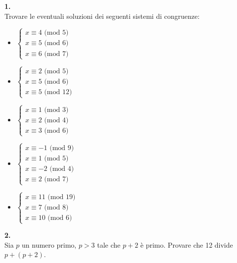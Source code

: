 \documentclass[italian,a4paper,11pt]
{article}
\begin{document}
\noindent
\begin{Ex}\textbf{ 1.}\\
Trovare le eventuali soluzioni dei seguenti sistemi di congruenze:
\begin{itemize}

\item $\begin{cases} x\equiv 4 \textrm{  (mod 5)} \\ x\equiv 5 \textrm{  (mod 6)} \\ x\equiv 6 \textrm{  (mod 7)} \end{cases} $

\item $  \begin{cases} x\equiv 2 \textrm{  (mod 5)} \\ x\equiv 5 \textrm{  (mod 6)} \\ x\equiv 5 \textrm{  (mod 12)} \end{cases} $

\item $  \begin{cases} x\equiv 1 \textrm{  (mod 3)} \\ x\equiv 2 \textrm{  (mod 4)} \\ x\equiv 3 \textrm{  (mod 6)}\end{cases} $

\item $  \begin{cases} x\equiv -1 \textrm{  (mod 9)} \\ x\equiv 1 \textrm{  (mod 5)} \\ x\equiv -2 \textrm{  (mod 4)} \\ x\equiv 2 \textrm{  (mod 7)}\end{cases} $

\item $  \begin{cases} x\equiv 11 \textrm{  (mod 19)} \\ x\equiv 7 \textrm{  (mod 8)} \\ x\equiv 10 \textrm{  (mod 6)}\end{cases} $

\end{itemize}
\end{Ex}

\vspace{0.4cm}
\noindent
\begin{Ex}\textbf{ 2.}\\
Sia $p$ un numero primo, $p>3$ tale che $p + 2$ \`e primo. Provare che 12 divide $p + (p + 2)$.
\end{Ex}
\end{document}
